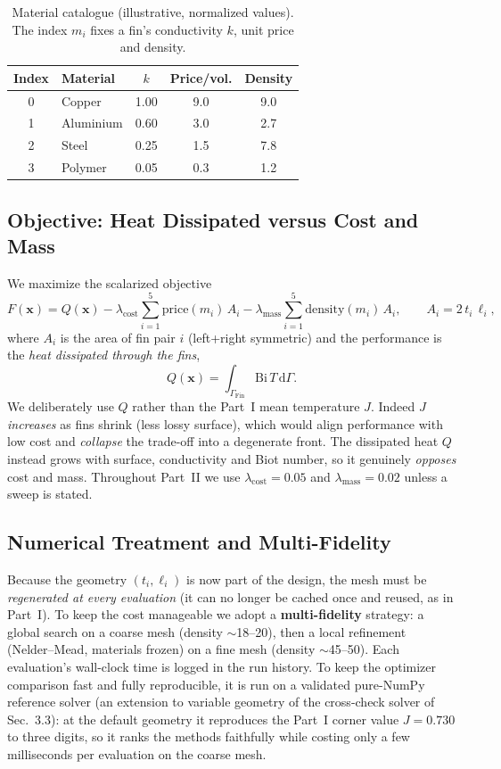 \documentclass[11pt,a4paper]{article}
\begin{document}
\begin{table}[h]
\centering
\caption{Material catalogue (illustrative, normalized values). The index $m_i$ fixes a fin's
conductivity $k$, unit price and density.}
\label{tab:mat}
\begin{tabular}{clccc}
\toprule
Index & Material & $k$ & Price/vol. & Density\\
\midrule
0 & Copper    & 1.00 & 9.0 & 9.0\\
1 & Aluminium & 0.60 & 3.0 & 2.7\\
2 & Steel     & 0.25 & 1.5 & 7.8\\
3 & Polymer   & 0.05 & 0.3 & 1.2\\
\bottomrule
\end{tabular}
\end{table}

\subsection{Objective: Heat Dissipated versus Cost and Mass}
We maximize the scalarized objective
\begin{equation}
F(\mathbf{x}) = Q(\mathbf{x})
 - \lambda_{\text{cost}}\sum_{i=1}^{5}\text{price}(m_i)\,A_i
 - \lambda_{\text{mass}}\sum_{i=1}^{5}\text{density}(m_i)\,A_i,
\qquad A_i = 2\,t_i\,\ell_i,
\end{equation}
where $A_i$ is the area of fin pair $i$ (left+right symmetric) and the performance is the
\emph{heat dissipated through the fins},
\begin{equation}
Q(\mathbf{x})=\int_{\Gamma_{\text{Fin}}}\mathrm{Bi}\,T\,\mathrm{d}\Gamma .
\end{equation}
We deliberately use $Q$ rather than the Part~I mean temperature $J$. Indeed $J$ \emph{increases} as
fins shrink (less lossy surface), which would align performance with low cost and \emph{collapse} the
trade-off into a degenerate front. The dissipated heat $Q$ instead grows with surface, conductivity
and Biot number, so it genuinely \emph{opposes} cost and mass. Throughout
Part~II we use $\lambda_{\text{cost}}=0.05$ and $\lambda_{\text{mass}}=0.02$ unless a sweep is stated.

\subsection{Numerical Treatment and Multi-Fidelity}
Because the geometry $(t_i,\ell_i)$ is now part of the design, the mesh must be \emph{regenerated at
every evaluation} (it can no longer be cached once and reused, as in Part~I). To keep the cost
manageable we adopt a \textbf{multi-fidelity} strategy: a global search on a coarse mesh (density
$\sim$18--20), then a local refinement (Nelder--Mead, materials frozen) on a fine mesh (density
$\sim$45--50). Each evaluation's wall-clock time is logged in the run history. To keep the optimizer
comparison fast and fully reproducible, it is run on a validated pure-NumPy reference solver (an
extension to variable geometry of the cross-check solver of Sec.~3.3): at the default geometry it
reproduces the Part~I corner value $J=0.730$ to three digits, so it ranks the methods faithfully
while costing only a few milliseconds per evaluation on the coarse mesh.
\end{document}
